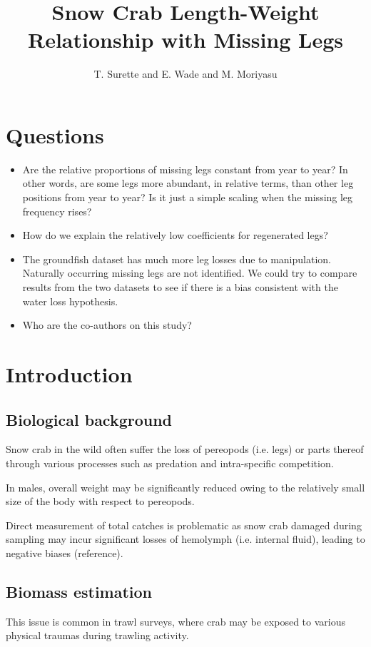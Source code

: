 \documentclass[letterpaper, 10pt]{article}
\title{Snow Crab Length-Weight Relationship with Missing Legs}
\author{T. Surette and E. Wade and M. Moriyasu}
\begin{document}
\maketitle 

\section{Questions}

\begin{itemize}
   \item Are the relative proportions of missing legs constant from year to year? In other words,
         are some legs more abundant, in relative terms, than other leg positions from year to year?
         Is it just a simple scaling when the missing leg frequency rises?
   \item How do we explain the relatively low coefficients for regenerated legs?
   \item The groundfish dataset has much more leg losses due to manipulation. Naturally occurring 
         missing legs are not identified. We could try to compare results from the two datasets to see 
         if there is a bias consistent with the water loss hypothesis.
   \item Who are the co-authors on this study?
\end{itemize}

\section{Introduction}

\subsection{Biological background}
Snow crab in the wild often suffer the loss of pereopods (i.e. legs) or parts thereof through various processes such as predation and intra-specific competition. 

In males, overall weight may be significantly reduced owing to the relatively small size of the body with respect to pereopods.

Direct measurement of total catches is problematic as snow crab damaged during sampling may incur significant losses of hemolymph (i.e. internal fluid), leading to negative biases (reference). 

\subsection{Biomass estimation}
This issue is common in trawl surveys, where crab may be exposed to various physical traumas during  trawling activity.
\end{document}

